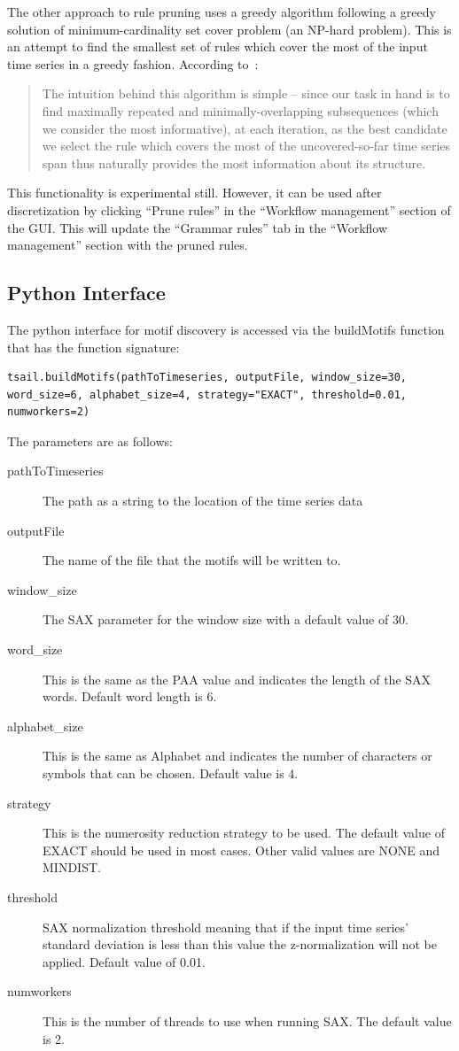 \documentclass[letterpaper, 12pt]{article}
\begin{document}
The other approach to rule pruning uses a greedy algorithm following a greedy solution of minimum-cardinality set cover problem (an NP-hard problem).  This is an attempt to find the smallest set of rules which cover the most of the input time series in a greedy fashion.  According to~\cite{pruneSite}:
\begin{quote}
	The intuition behind this algorithm is simple -- since our task in hand is to find maximally repeated and minimally-overlapping subsequences (which we consider the most informative), at each iteration, as the best candidate we select the rule which covers the most of the uncovered-so-far time series span thus naturally provides the most information about its structure.
\end{quote}

This functionality is experimental still.  However, it can be used after discretization by clicking ``Prune rules'' in the ``Workflow management'' section of the GUI.  This will update the ``Grammar rules'' tab in the ``Workflow management'' section with the pruned rules.




\subsection{Python Interface}
The python interface for motif discovery is accessed via the buildMotifs function that has the function signature:
\begin{lstlisting}
tsail.buildMotifs(pathToTimeseries, outputFile, window_size=30, word_size=6, alphabet_size=4, strategy="EXACT", threshold=0.01, numworkers=2)
\end{lstlisting}

The parameters are as follows:
\begin{description}
	\item[pathToTimeseries] The path as a string to the location of the time series data
	\item[outputFile] The name of the file that the motifs will be written to.
	\item[window\_size] The SAX parameter for the window size with a default value of 30.
	\item[word\_size] This is the same as the PAA value and indicates the length of the SAX words.  Default word length is 6.
	\item[alphabet\_size] This is the same as Alphabet and indicates the number of characters or symbols that can be chosen.  Default value is 4.
	\item[strategy] This is the numerosity reduction strategy to be used.  The default value of EXACT should be used in most cases.  Other valid values are NONE and MINDIST.
	\item[threshold] SAX normalization threshold meaning that if the input time series' standard deviation is less than this value the z-normalization will not be applied. Default value of 0.01.
	\item[numworkers] This is the number of threads to use when running SAX.  The default value is 2.
\end{description}
\end{document}
